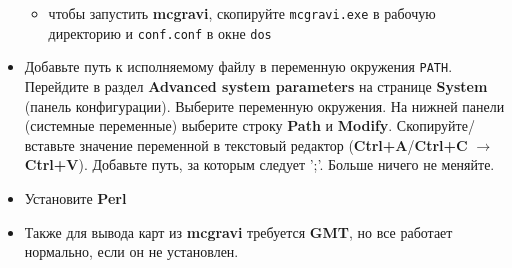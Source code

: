 \begin{itemize}
\begin{itemize}
        \item чтобы запустить \textbf{\textsf{mcgravi}}, скопируйте
        \verb|mcgravi.exe| в рабочую директорию и \verb|conf.conf| в окне \verb|dos|
        
    \end{itemize}

    \item Добавьте путь к исполняемому файлу в переменную окружения \verb|PATH|.
    Перейдите в раздел \textbf{Advanced system parameters} на странице
    \textbf{System} (панель конфигурации). Выберите переменную окружения. На
    нижней панели (системные переменные) выберите строку \textbf{Path} и
    \textbf{Modify}.  Скопируйте/вставьте значение переменной в текстовый
    редактор (\textbf{Ctrl+A}/\textbf{Ctrl+C} $\rightarrow$ \textbf{Ctrl+V}). Добавьте путь, за
    которым следует ';'. Больше ничего не меняйте.

    \item Установите \textbf{\textsf{Perl}}
    
    \item Также для вывода карт из \textbf{\textsf{mcgravi}} требуется
    \textbf{\textsf{GMT}}, но все работает нормально, если он не установлен.
    
\end{itemize}